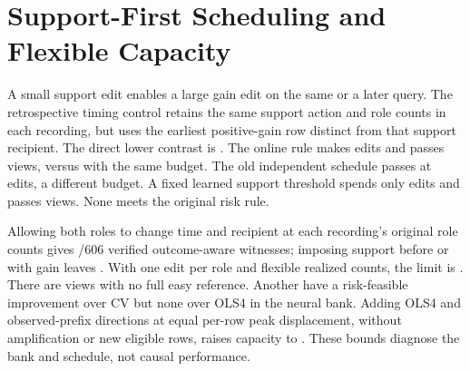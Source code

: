 \section{Support-First Scheduling and Flexible Capacity}

A small support edit enables a large gain edit on the same
or a later query. The retrospective timing control retains the
same support action and role counts in each recording, but
uses the earliest positive-gain row distinct from that support
recipient. The direct lower contrast is \ClockSupportEffect{}.
The online rule makes \ClockSupportAnchorEdits{} edits and
passes \ClockSupportAnchorJoint{} views, versus
\ClockSupportMatchedJoint{} with the same budget. The old
independent schedule passes \ClockSupportIndependentJoint{}
at \ClockSupportIndependentEdits{} edits, a different budget.
A fixed learned support threshold spends only
\ClockSupportLearnedEdits{} edits and passes
\ClockSupportLearnedJoint{} views. None meets the original risk rule.

Allowing both roles to change time and recipient at each
recording's original role counts gives \ClockSupportAny{}/606
verified outcome-aware witnesses; imposing support before or
with gain leaves \ClockSupportOrdered{}. With one edit per role
and flexible realized counts, the limit is \ClockSupportAtMost{}.
There are \ClockSupportNoReference{} views with no full easy
reference. Another \ClockSupportOLSBlocked{} have a risk-feasible
improvement over CV but none over OLS4 in the neural bank.
Adding OLS4 and observed-prefix directions at equal per-row
peak displacement, without amplification or new eligible rows,
raises capacity to \ClockSupportShape{}. These bounds diagnose
the bank and schedule, not causal performance.
